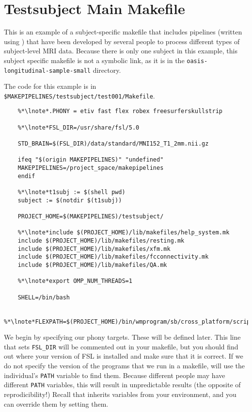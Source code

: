 \section{Testsubject Main Makefile}
\label{example:testsubjectxfm}

This is an example of a subject-specific makefile that includes
pipelines (written using \maken{}) that have been developed by several people to process different types of
subject-level MRI data. Because there is only one subject in
this example, this subject specific makefile is not a symbolic link,
as it is in the \texttt{oasis-longitudinal-sample-small} directory. 

The code for this example is in \texttt{\$MAKEPIPELINES/testsubject/test001/Makefile}. 

\setcounter{codehighlight}{0} %
\begin{lstlisting}
	%*\lnote*.PHONY = etiv fast flex robex freesurferskullstrip 

	%*\lnote*FSL_DIR=/usr/share/fsl/5.0 

	STD_BRAIN=$(FSL_DIR)/data/standard/MNI152_T1_2mm.nii.gz 

	ifeq "$(origin MAKEPIPELINES)" "undefined"
	MAKEPIPELINES=/project_space/makepipelines 
	endif 

	%*\lnote*t1subj := $(shell pwd) 
	subject := $(notdir $(t1subj)) 

	PROJECT_HOME=$(MAKEPIPELINES)/testsubject/

	%*\lnote*include $(PROJECT_HOME)/lib/makefiles/help_system.mk 
	include $(PROJECT_HOME)/lib/makefiles/resting.mk 
	include $(PROJECT_HOME)/lib/makefiles/xfm.mk 
	include $(PROJECT_HOME)/lib/makefiles/fcconnectivity.mk 
	include $(PROJECT_HOME)/lib/makefiles/QA.mk 

	%*\lnote*export OMP_NUM_THREADS=1 

	SHELL=/bin/bash 

	%*\lnote*FLEXPATH=$(PROJECT_HOME)/bin/wmprogram/sb/cross_platform/scripts

\end{lstlisting}

 We begin by specifying our phony targets. These will be
defined later. 
 This line that sets \texttt{FSL_DIR} will be commented out in
your makefile, but you should find out where your version of FSL is
installed and make sure that it is correct. If we do not specify the
version of the programs that we run in a makefile, \maken{} will use
the individual's \texttt{PATH} variable to find them. Because
different people may have different \texttt{PATH} variables, this will
result in unpredictable results (the opposite of reprodicibility!)
Recall that \maken{} inherits variables from your environment, and you
can override them by setting them.

